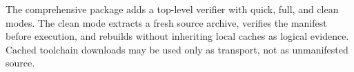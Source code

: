 \documentclass[10pt]{article}
\begin{document}
The comprehensive package adds a top-level verifier with quick, full, and
clean modes.  The clean mode extracts a fresh source archive, verifies the
manifest before execution, and rebuilds without inheriting local caches as
logical evidence.  Cached toolchain downloads may be used only as transport,
not as unmanifested source.



\end{document}
